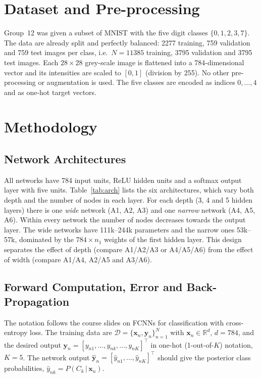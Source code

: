 \documentclass[runningheads]{llncs}
\begin{document}
\section{Dataset and Pre-processing}
Group~12 was given a subset of MNIST with the five digit classes $\{0,1,2,3,7\}$. The data are
already split and perfectly balanced: 2277 training, 759 validation and 759 test images per class,
i.e.\ $N=11385$ training, 3795 validation and 3795 test images. Each $28\times28$ grey-scale
image is flattened into a 784-dimensional vector and its intensities are scaled to $[0,1]$
(division by 255). No other pre-processing or augmentation is used. The five classes are
encoded as indices $0,\dots,4$ and as one-hot target vectors.

\section{Methodology}
\subsection{Network Architectures}
All networks have 784 input units, ReLU hidden units and a softmax output layer with five units.
Table~\ref{tab:arch} lists the six architectures, which vary both depth and the number of nodes in
each layer. For each depth (3, 4 and 5 hidden layers) there is one \emph{wide} network (A1, A2, A3)
and one \emph{narrow} network (A4, A5, A6). Within every network the number of nodes decreases
towards the output layer. The wide networks have 111k--244k parameters and the narrow ones
53k--57k, dominated by the $784\times n_1$ weights of the first hidden layer. This design separates
the effect of depth (compare A1/A2/A3 or A4/A5/A6) from the effect of width (compare A1/A4, A2/A5
and A3/A6).
\begin{table}[!htb]
\centering
\caption{FCNN architectures (input 784, output 5, ReLU hidden layers, softmax output). A1--A3 are
wide and A4--A6 narrow networks with 3, 4 and 5 hidden layers.}\label{tab:arch}
\setlength{\tabcolsep}{9pt}

\end{table}

\subsection{Forward Computation, Error and Back-Propagation}
The notation follows the course slides on FCNNs for classification with cross-entropy loss. The
training data are $\mathcal{D}=\{\mathbf{x}_n,\mathbf{y}_n\}_{n=1}^{N}$ with
$\mathbf{x}_n\in\mathbb{R}^{d}$, $d=784$, and the desired output
$\mathbf{y}_n=[y_{n1},\dots,y_{nk},\dots,y_{nK}]^\top$ in one-hot (1-out-of-$K$) notation, $K=5$.
The network output $\hat{\mathbf{y}}_n=[\hat{y}_{n1},\dots,\hat{y}_{nK}]^\top$ should give the
posterior class probabilities, $\hat{y}_{nk}=P(C_k\,|\,\mathbf{x}_n)$.
\end{document}
